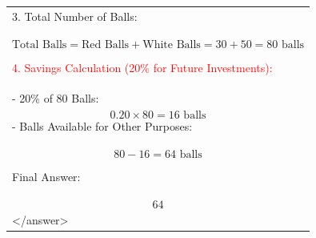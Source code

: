 \documentclass[11pt]{article}
\begin{document}
\begin{table}[htbp]
{\begin{tabular}{p{}}
    3. Total Number of Balls:\\
    \[\text{Total Balls} = \text{Red Balls} + \text{White Balls} = 30 + 50 = 80 \text{ balls}\]

    \textcolor{red}{
    4. Savings Calculation (20\% for Future Investments):}\\
    - 20\% of 80 Balls:\\
    \[0.20 \times 80 = 16 \text{ balls}\]
    - Balls Available for Other Purposes:\\
    \[80 - 16 = 64 \text{ balls}\]
    
    Final Answer:\\
    \[\boxed{64}\]
    \\
    \textless /answer\textgreater
    \\
    \bottomrule
  \end{tabular}
}
\end{table}
\end{document}
